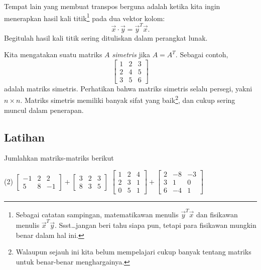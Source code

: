 Tempat lain yang membuat transpos berguna adalah ketika kita ingin menerapkan hasil kali
titik\footnote{Sebagai catatan sampingan, matematikawan
menulis $\vec{y}^T\vec{x}$ dan fisikawan
menulis $\vec{x}^T\vec{y}$. Ssst\ldots jangan beri tahu siapa pun, tetapi para fisikawan
mungkin benar dalam hal ini.}
pada dua vektor kolom:
\begin{equation*}
\vec{x} \cdot \vec{y} = \vec{y}^T \vec{x} .
\end{equation*}
Begitulah hasil kali titik sering dituliskan dalam perangkat lunak.

Kita mengatakan suatu matriks $A$ \emph{simetris}
jika $A = A^T$. Sebagai contoh,
\begin{equation*}
\begin{bmatrix}
1 & 2 & 3 \\
2 & 4 & 5 \\
3 & 5 & 6
\end{bmatrix}
\end{equation*}
adalah matriks simetris. Perhatikan bahwa matriks simetris selalu
persegi, yakni $n \times n$. Matriks simetris
memiliki banyak sifat yang baik\footnote{Walaupun sejauh ini kita belum mempelajari
cukup banyak tentang matriks untuk benar-benar menghargainya.},
dan cukup sering muncul dalam penerapan.

\subsection{Latihan}

\begin{exercise}
Jumlahkan matriks-matriks berikut
\begin{tasks}(2)
\task
$\begin{bmatrix}
-1 & 2 & 2 \\
5 & 8 & -1
\end{bmatrix}
+
\begin{bmatrix}
3 & 2 & 3 \\
8 & 3 & 5
\end{bmatrix}$
\task
$\begin{bmatrix}
1 & 2 & 4 \\
2 & 3 & 1 \\
0 & 5 & 1
\end{bmatrix}
+
\begin{bmatrix}
2 & -8 & -3 \\
3 & 1 & 0 \\
6 & -4 & 1
\end{bmatrix}$
\end{tasks}
\end{exercise}


